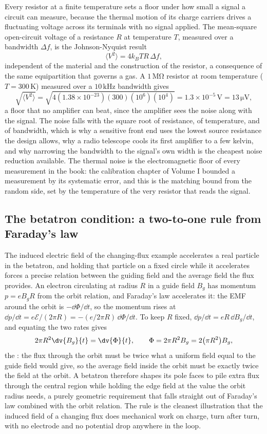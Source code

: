 Every resistor at a finite temperature sets a floor under how small a signal
a circuit can measure, because the thermal motion of its charge carriers
drives a fluctuating voltage across its terminals with no signal applied.
The mean-square open-circuit voltage of a resistance $R$ at temperature $T$,
measured over a bandwidth $\Delta f$, is the Johnson-Nyquist result
\[
\langle V^{2}\rangle = 4 k_B T R\,\Delta f,
\]
independent of the material and the construction of the resistor, a
consequence of the same equipartition that governs a gas. A $1\,\si{\mega
\ohm}$ resistor at room temperature ($T = 300\,\si{\kelvin}$) measured over
a $10\,\si{\kilo\hertz}$ bandwidth gives
\[
\sqrt{\langle V^{2}\rangle} = \sqrt{4(1.38\times 10^{-23})(300)(10^{6})
(10^{4})} = 1.3\times 10^{-5}\,\si{\volt} = 13\,\si{\micro\volt},
\]
a floor that no amplifier can beat, since the amplifier sees the noise
along with the signal. The noise falls with the square root of resistance,
of temperature, and of bandwidth, which is why a sensitive front end uses
the lowest source resistance the design allows, why a radio telescope cools
its first amplifier to a few kelvin, and why narrowing the bandwidth to the
signal's own width is the cheapest noise reduction available. The thermal
noise is the electromagnetic floor of every measurement in the book: the
calibration chapter of Volume I bounded a measurement by its systematic
error, and this is the matching bound from the random side, set by the
temperature of the very resistor that reads the signal.

\subsection{The betatron condition: a two-to-one rule from Faraday's law}

The induced electric field of the changing-flux example accelerates a real
particle in the betatron, and holding that particle on a fixed circle while
it accelerates forces a precise relation between the guiding field and the
average field the flux provides. An electron circulating at radius $R$ in a
guide field $B_g$ has momentum $p = e B_g R$ from the orbit relation, and
Faraday's law accelerates it: the EMF around the orbit is $-\dd\Phi/\dd t$,
so the momentum rises at $\dd p/\dd t = e\mathcal{E}/(2\pi R) = -(e/2\pi R)
\,\dd\Phi/\dd t$. To keep $R$ fixed, $\dd p/\dd t = e R\,\dd B_g/\dd t$, and
equating the two rates gives
\[
2\pi R^{2}\dv{B_g}{t} = \dv{\Phi}{t}, \qquad \Phi = 2\pi R^{2} B_g = 2\bigl(
\pi R^{2}\bigr)B_g,
\]
the : the flux through the orbit must be twice
what a uniform field equal to the guide field would give, so the average
field inside the orbit must be exactly twice the field at the orbit. A
betatron therefore shapes its pole faces to pile extra flux through the
central region while holding the edge field at the value the orbit radius
needs, a purely geometric requirement that falls straight out of Faraday's
law combined with the orbit relation. The rule is the cleanest illustration
that the induced field of a changing flux does mechanical work on charge,
turn after turn, with no electrode and no potential drop anywhere in the
loop.

